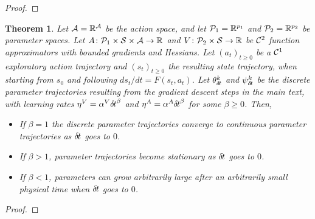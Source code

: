 \documentclass[11pt]{article}
\newtheorem{theorem}{Theorem}
\begin{document}
\begin{proof}
	
\end{proof}
\begin{theorem}
	Let $\cal A = \mathbb{R}^A$ be the action space, and let ${\cal P}_1 = \mathbb{R}^{p_1}$ and ${\cal P}_2 = \mathbb{R}^{p_2}$ be parameter spaces.  Let
	$A\colon {\cal P}_1 \times {\cal S} \times {\cal A} \rightarrow \mathbb{R}$
	and $V\colon {\cal P}_2 \times {\cal S} \rightarrow \mathbb{R}$ be ${\cal
	C}^2$ function approximators with bounded gradients and Hessians. Let
	$(a_t)_{t\geq 0}$ be a ${\cal C}^1$ exploratory action trajectory and
	$(s_t)_{t\geq 0}$ the resulting state trajectory, when starting from $s_0$ and
	following $ds_t/dt=F(s_t,a_t)$.  Let $\theta^k_{\delta\hspace{-.1em}t}$ and
	$\psi^k_{\delta\hspace{-.1em}t}$ be the discrete parameter trajectories resulting from
	the gradient descent steps in the main text, with
	learning rates $\eta^V = \alpha^V {\delta\hspace{-.1em}t}^\beta$ and $\eta^A =
	\alpha^A {\delta\hspace{-.1em}t}^\beta$ for some $\beta\geq 0$. Then,
	\begin{itemize}
		\item If $\beta = 1$ the discrete parameter trajectories converge to continuous parameter
			trajectories as ${\delta\hspace{-.1em}t}$ goes to $0$.
		\item If $\beta > 1$, parameter trajectories become
		stationary as
			${\delta\hspace{-.1em}t}$ goes to $0$.
		\item If $\beta < 1$, parameters can grow arbitrarily large after an arbitrarily small physical time when ${\delta\hspace{-.1em}t}$ goes to $0$.
	\end{itemize}
\end{theorem}
\begin{proof}
	
	
\end{proof}
\end{document}
